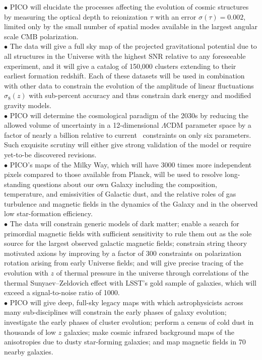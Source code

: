 \documentclass[PICOAPC.tex]{subfiles}
\begin{document}
$\bullet$ PICO will elucidate the processes affecting the evolution of cosmic structures by measuring the optical depth to reionization $\tau$ with an error $\sigma(\tau) = 0.002$, limited only by the small number of spatial modes available in the largest angular scale CMB polarization. \\
$\bullet$ The data will give a full sky map of the projected gravitational potential due to all structures in the Universe with the highest \ac{SNR} relative to any foreseeable experiment, and it will give a catalog of 150,000 clusters extending to their earliest formation redshift. Each of these datasets will be used in combination with other data to constrain the evolution of the amplitude of linear fluctuations $\sigma_{8}(z)$ with sub-percent accuracy and thus constrain dark energy and modified gravity models.  \\
$\bullet$ PICO will determine the cosmological paradigm of the 2030s by reducing the allowed volume of uncertainty in a 12-dimensional $ \Lambda$CDM parameter space by a factor of nearly a billion relative to current \planck\ constraints on only six parameters. Such exquisite scrutiny will either give strong validation of the model or require yet-to-be discovered revisions. \\
$\bullet$ PICO's maps of the Milky Way, which will have 3000 times more independent pixels compared to those available from Planck, will be used to resolve long-standing questions about our own Galaxy including the 
composition, temperature, and emissivities of Galactic dust, and the relative roles of gas turbulence and magnetic fields in the dynamics of the Galaxy and in the observed low star-formation efficiency. \\
$\bullet$ The data will constrain generic models of dark matter; enable a search for primordial magnetic fields with sufficient sensitivity to rule them out as the sole source for the largest observed galactic magnetic fields; constrain string theory motivated axions by improving by a factor of 300 constraints on polarization rotation arising from early Universe fields;  and will give precise tracing of the evolution with $z$ of thermal pressure in the universe through correlations of the thermal Sunyaev--Zeldovich effect with LSST's gold sample of galaxies, which will exceed a signal-to-noise ratio of 1000. \\
$\bullet$ PICO will give deep, full-sky legacy maps with which astrophysicists across many sub-disciplines will constrain the early phases of galaxy evolution;  
investigate the early phases of cluster evolution;
perform a census of cold dust in thousands of low $z$ galaxies; make cosmic infrared background maps of the anisotropies due to dusty star-forming galaxies; and map magnetic fields in 70 nearby galaxies. 
\end{document}
